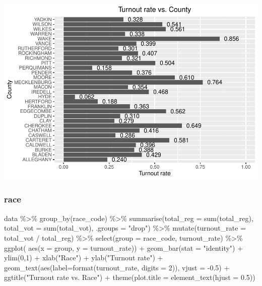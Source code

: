 \documentclass[
]{article}
\newenvironment{Shaded}{\begin{snugshade}}{\end{snugshade}}
\newcommand{\AttributeTok}[1]{\textcolor[rgb]{0.77,0.63,0.00}{#1}}
\newcommand{\DecValTok}[1]{\textcolor[rgb]{0.00,0.00,0.81}{#1}}
\newcommand{\FloatTok}[1]{\textcolor[rgb]{0.00,0.00,0.81}{#1}}
\newcommand{\FunctionTok}[1]{\textcolor[rgb]{0.00,0.00,0.00}{#1}}
\newcommand{\NormalTok}[1]{#1}
\newcommand{\SpecialCharTok}[1]{\textcolor[rgb]{0.00,0.00,0.00}{#1}}
\newcommand{\StringTok}[1]{\textcolor[rgb]{0.31,0.60,0.02}{#1}}
\begin{document}
\includegraphics{CS2_files/figure-latex/unnamed-chunk-8-1.pdf}

\hypertarget{race}{%
\subsubsection{race}\label{race}}

\begin{Shaded}
\begin{Highlighting}[]
\NormalTok{data }\SpecialCharTok{\%\textgreater{}\%}
  \FunctionTok{group\_by}\NormalTok{(race\_code) }\SpecialCharTok{\%\textgreater{}\%}
  \FunctionTok{summarise}\NormalTok{(}\AttributeTok{total\_reg =} \FunctionTok{sum}\NormalTok{(total\_reg),}
            \AttributeTok{total\_vot =} \FunctionTok{sum}\NormalTok{(total\_vot), }\AttributeTok{.groups =} \StringTok{"drop"}\NormalTok{) }\SpecialCharTok{\%\textgreater{}\%}
  \FunctionTok{mutate}\NormalTok{(}\AttributeTok{turnout\_rate =}\NormalTok{ total\_vot }\SpecialCharTok{/}\NormalTok{ total\_reg) }\SpecialCharTok{\%\textgreater{}\%}
  \FunctionTok{select}\NormalTok{(}\AttributeTok{group =}\NormalTok{ race\_code, turnout\_rate) }\SpecialCharTok{\%\textgreater{}\%}
  \FunctionTok{ggplot}\NormalTok{( }\FunctionTok{aes}\NormalTok{(}\AttributeTok{x =}\NormalTok{ group, }\AttributeTok{y =}\NormalTok{ turnout\_rate)) }\SpecialCharTok{+}
  \FunctionTok{geom\_bar}\NormalTok{(}\AttributeTok{stat =} \StringTok{"identity"}\NormalTok{) }\SpecialCharTok{+}
  \FunctionTok{ylim}\NormalTok{(}\DecValTok{0}\NormalTok{,}\DecValTok{1}\NormalTok{) }\SpecialCharTok{+}
  \FunctionTok{xlab}\NormalTok{(}\StringTok{"Race"}\NormalTok{) }\SpecialCharTok{+} \FunctionTok{ylab}\NormalTok{(}\StringTok{"Turnout rate"}\NormalTok{) }\SpecialCharTok{+}
  \FunctionTok{geom\_text}\NormalTok{(}\FunctionTok{aes}\NormalTok{(}\AttributeTok{label=}\FunctionTok{format}\NormalTok{(turnout\_rate, }\AttributeTok{digits =} \DecValTok{2}\NormalTok{)), }\AttributeTok{vjust =} \SpecialCharTok{{-}}\FloatTok{0.5}\NormalTok{) }\SpecialCharTok{+}
  \FunctionTok{ggtitle}\NormalTok{(}\StringTok{"Turnout rate vs. Race"}\NormalTok{) }\SpecialCharTok{+}
    \FunctionTok{theme}\NormalTok{(}\AttributeTok{plot.title =} \FunctionTok{element\_text}\NormalTok{(}\AttributeTok{hjust =} \FloatTok{0.5}\NormalTok{))}
\end{Highlighting}
\end{Shaded}
\end{document}

